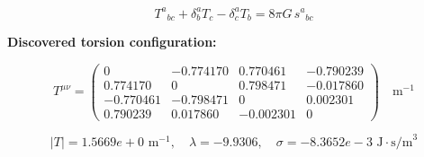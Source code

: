 
\begin{equation}
  T^a{}_{bc} + \delta^a_b T_c - \delta^a_c T_b = 8\pi G \, s^a{}_{bc}
\end{equation}

\textbf{Discovered torsion configuration:}

\begin{equation}
  T^{\mu\nu} = \begin{pmatrix}
    0 & -0.774170 & 0.770461 & -0.790239 \\
    0.774170 & 0 & 0.798471 & -0.017860 \\
    -0.770461 & -0.798471 & 0 & 0.002301 \\
    0.790239 & 0.017860 & -0.002301 & 0
  \end{pmatrix} \quad \text{m}^{-1}
\end{equation}

\begin{equation}
  |T| = 1.5669e+0 \text{ m}^{-1}, \quad
  \lambda = -9.9306, \quad
  \sigma = -8.3652e-3 \text{ J}\cdot\text{s/m}^3
\end{equation}